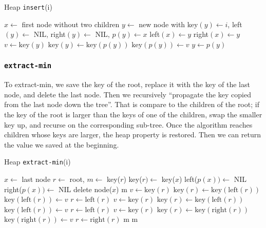 \documentclass [12pt]{article}
\begin{document}
\begin{algorithm}
\caption{Heap \texttt{insert}(i)}\label{alg:heap_insert}
\begin{algorithmic}
\STATE $x \gets $ first node without two children
\STATE $y \gets$ new node with key$(y) \gets i$, left$(y) \gets $ NIL, right$(y) \gets $ NIL, $p(y)\gets x$ 
  \STATE left$(x) \gets y$
\ELSE 
  \STATE right$(x) \gets y$
\ENDIF
{}
  \STATE $v \gets \text{key}(y)$ 
  \STATE $\text{key}(y) \gets \text{key}(p(y)) $
  \STATE $\text{key}(p(y)) \gets v$
  \STATE $y \gets p(y)$
\ENDWHILE
\end{algorithmic}
\end{algorithm}

\subsubsection{\texttt{extract-min}}
To extract-min, we save the key of the root, replace it with the key of the last node, and delete the last node. Then we recursively ``propagate the key copied from the last node down the tree''. That is compare to the children of the root; if the key of the root is larger than the keys of one of the children, swap the smaller key up, and recurse on the corresponding sub-tree. Once the algorithm reaches children whose keys are larger, the heap property is restored. Then we can return the value we saved at the beginning.

\begin{algorithm}
\caption{Heap \texttt{extract-min}(i)}
\label{alg:heap_extract}
\begin{algorithmic}
\STATE $x \gets $ last node
\STATE $r \gets$ root, $m \gets$ key($r$)
\STATE key($r) \gets $ key($x$)
  \STATE left($p(x)) \gets$ NIL
\ELSE
  \STATE right($p(x)) \gets$ NIL
\ENDIF
delete node($x$)
    \RETURN m
    \STATE $v \gets \text{key}(r)$
    \STATE $\text{key}(r) \gets \text{key}(\text{left}(r))$
    \STATE $\text{key}(\text{left}(r)) \gets v$
    \STATE $r \gets \text{left}(r)$
    \STATE $v \gets \text{key}(r)$
    \STATE $\text{key}(r) \gets \text{key}(\text{left}(r))$
    \STATE $\text{key}(\text{left}(r)) \gets v$
    \STATE $r \gets \text{left}(r)$
    \STATE $v \gets \text{key}(r)$
    \STATE $\text{key}(r) \gets \text{key}(\text{right}(r))$
    \STATE $\text{key}(\text{right}(r)) \gets v$
    \STATE $r \gets \text{right}(r)$
  \ELSE
    \RETURN m
  \ENDIF
\ENDWHILE
\RETURN m

\end{algorithmic}
\end{algorithm}
\end{document}

